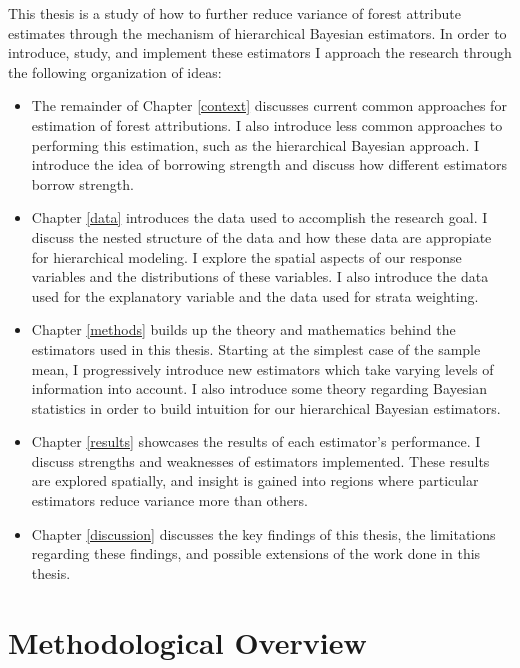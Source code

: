 \documentclass[12pt,twoside]{reedthesis}
\providecommand{\tightlist}{%
  \setlength{\itemsep}{0pt}\setlength{\parskip}{0pt}}
\begin{document}
This thesis is a study of how to further reduce variance of forest attribute estimates through the mechanism of hierarchical Bayesian estimators. In order to introduce, study, and implement these estimators I approach the research through the following organization of ideas:
\begin{itemize}
\tightlist
\item
  The remainder of Chapter \ref{context} discusses current common approaches for estimation of forest attributions. I also introduce less common approaches to performing this estimation, such as the hierarchical Bayesian approach. I introduce the idea of borrowing strength and discuss how different estimators borrow strength.
\item
  Chapter \ref{data} introduces the data used to accomplish the research goal. I discuss the nested structure of the data and how these data are appropiate for hierarchical modeling. I explore the spatial aspects of our response variables and the distributions of these variables. I also introduce the data used for the explanatory variable and the data used for strata weighting.
\item
  Chapter \ref{methods} builds up the theory and mathematics behind the estimators used in this thesis. Starting at the simplest case of the sample mean, I progressively introduce new estimators which take varying levels of information into account. I also introduce some theory regarding Bayesian statistics in order to build intuition for our hierarchical Bayesian estimators.
\item
  Chapter \ref{results} showcases the results of each estimator's performance. I discuss strengths and weaknesses of estimators implemented. These results are explored spatially, and insight is gained into regions where particular estimators reduce variance more than others.
\item
  Chapter \ref{discussion} discusses the key findings of this thesis, the limitations regarding these findings, and possible extensions of the work done in this thesis.
\end{itemize}
\hypertarget{methodological-overview}{%
\section{Methodological Overview}\label{methodological-overview}}
\end{document}
